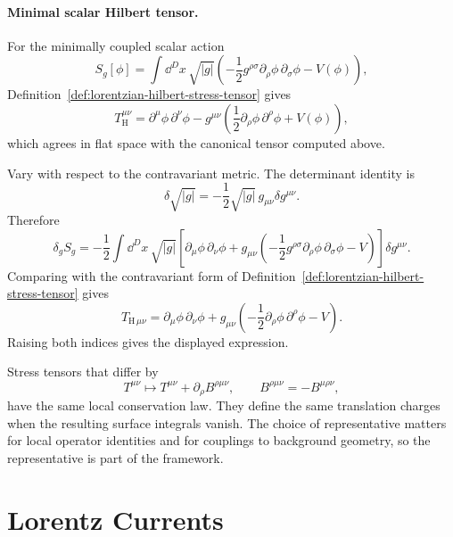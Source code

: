 \paragraph{Minimal scalar Hilbert tensor.}
For the minimally coupled scalar action
\[
  S_g[\phi]
  =
  \int\dd^Dx\,\sqrt{|g|}
  \left(
    -\frac12g^{\rho\sigma}\partial_\rho\phi\,\partial_\sigma\phi
    -V(\phi)
  \right),
\]
Definition~\ref{def:lorentzian-hilbert-stress-tensor} gives
\[
  T_{\mathrm H}^{\mu\nu}
  =
  \partial^\mu\phi\,\partial^\nu\phi
  -
  g^{\mu\nu}
  \left(
    \frac12\partial_\rho\phi\,\partial^\rho\phi+V(\phi)
  \right),
\]
which agrees in flat space with
the canonical tensor computed above.

Vary with respect to the contravariant metric.  The determinant identity is
\[
  \delta\sqrt{|g|}
  =
  -\frac12\sqrt{|g|}\,g_{\mu\nu}\delta g^{\mu\nu}.
\]
Therefore
\[
  \delta_g S_g
  =
  -\frac12
  \int\dd^Dx\,\sqrt{|g|}
  \left[
    \partial_\mu\phi\,\partial_\nu\phi
    +
    g_{\mu\nu}
    \left(
      -\frac12g^{\rho\sigma}\partial_\rho\phi\,\partial_\sigma\phi
      -V
    \right)
  \right]\delta g^{\mu\nu}.
\]
Comparing with the contravariant form of
Definition~\ref{def:lorentzian-hilbert-stress-tensor} gives
\[
  T_{\mathrm H\,\mu\nu}
  =
  \partial_\mu\phi\,\partial_\nu\phi
  +
  g_{\mu\nu}
  \left(
    -\frac12\partial_\rho\phi\,\partial^\rho\phi
    -V
  \right).
\]
Raising both indices gives the displayed expression.

\begin{definition}
\label{def:stress-tensor-improvement}
Stress tensors that differ by
\[
  T^{\mu\nu}\longmapsto
  T^{\mu\nu}+\partial_\rho B^{\rho\mu\nu},
  \qquad
  B^{\rho\mu\nu}=-B^{\mu\rho\nu},
\]
have the same local conservation law.  They define the same translation
charges when the resulting surface integrals vanish.  The choice of
representative matters for local operator identities and for couplings to
background geometry, so the representative is part of the framework.
\end{definition}

\section{Lorentz Currents}

